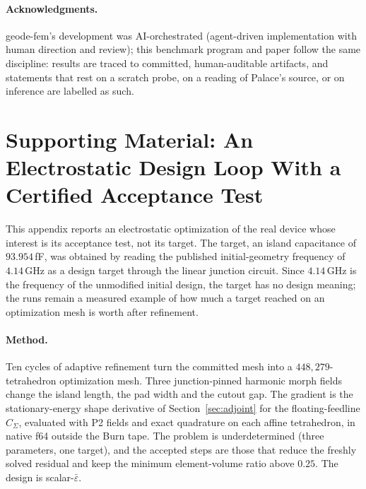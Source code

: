 \documentclass{anvil-paper}
\begin{document}
\paragraph{Acknowledgments.}
geode-fem's development was AI-orchestrated (agent-driven implementation
with human direction and review); this benchmark program and paper
follow the same discipline: results are traced to committed,
human-auditable artifacts, and statements that rest on a scratch probe,
on a reading of Palace's source, or on inference are labelled as such.

\clearpage
\appendix
\section{Supporting Material: An Electrostatic Design Loop With a Certified Acceptance Test}
\label{sec:appendix-supporting}

This appendix reports an electrostatic optimization of the real device
whose interest is its acceptance test, not its target. The target, an
island capacitance of $93.954$\,fF, was obtained by reading the published
initial-geometry frequency of $4.14$\,GHz as a design target through the
linear junction circuit. Since $4.14$\,GHz is the frequency of the
unmodified initial design, the target has no design meaning; the runs
remain a measured example of how much a target reached on an
optimization mesh is worth after refinement.

\paragraph{Method.}
Ten cycles of adaptive refinement turn the committed mesh into a
$448{,}279$-tetrahedron optimization mesh. Three junction-pinned harmonic
morph fields change the island length, the pad width and the cutout gap.
The gradient is the stationary-energy shape derivative of
Section~\ref{sec:adjoint} for the floating-feedline $C_\Sigma$, evaluated
with P2 fields and exact quadrature on each affine tetrahedron, in native
f64 outside the Burn tape. The problem is underdetermined (three
parameters, one target), and the accepted steps are those that reduce the
freshly solved residual and keep the minimum element-volume ratio above
$0.25$. The design is scalar-$\bar\varepsilon$.
\end{document}

